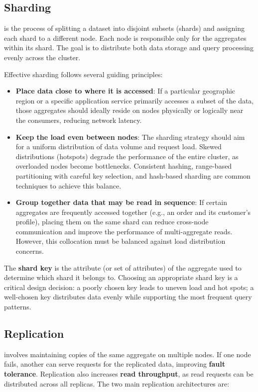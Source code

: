 \subsection{Sharding}
 is the process of splitting a dataset into disjoint subsets (shards) and assigning each shard to a different node. Each node is responsible only for the aggregates within its shard. The goal is to distribute both data storage and query processing evenly across the cluster.

Effective sharding follows several guiding principles:
\begin{itemize}
    \item \textbf{Place data close to where it is accessed}: If a particular geographic region or a specific application service primarily accesses a subset of the data, those aggregates should ideally reside on nodes physically or logically near the consumers, reducing network latency.
    \item \textbf{Keep the load even between nodes}: The sharding strategy should aim for a uniform distribution of data volume and request load. Skewed distributions (hotspots) degrade the performance of the entire cluster, as overloaded nodes become bottlenecks. Consistent hashing, range-based partitioning with careful key selection, and hash-based sharding are common techniques to achieve this balance.
    \item \textbf{Group together data that may be read in sequence}: If certain aggregates are frequently accessed together (e.g., an order and its customer's profile), placing them on the same shard can reduce cross-node communication and improve the performance of multi-aggregate reads. However, this collocation must be balanced against load distribution concerns.
\end{itemize}
The \textbf{shard key} is the attribute (or set of attributes) of the aggregate used to determine which shard it belongs to. Choosing an appropriate shard key is a critical design decision: a poorly chosen key leads to uneven load and hot spots; a well-chosen key distributes data evenly while supporting the most frequent query patterns.

\subsection{Replication}
 involves maintaining copies of the same aggregate on multiple nodes. If one node fails, another can serve requests for the replicated data, improving \textbf{fault tolerance}. Replication also increases \textbf{read throughput}, as read requests can be distributed across all replicas. The two main replication architectures are:

